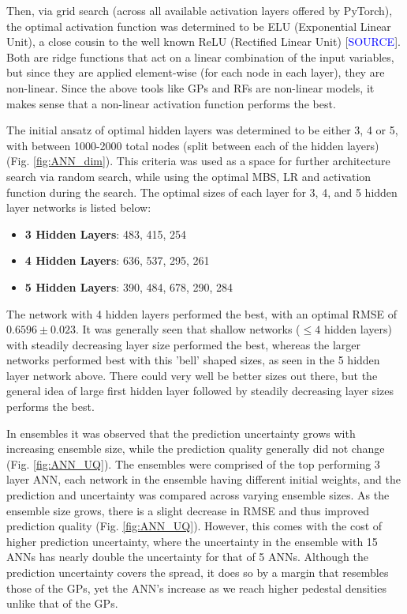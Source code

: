 \documentclass[a4paper, twoside, final, 12pt]{article}
\begin{document}
{Then, via grid search (across all available activation layers offered by PyTorch), the optimal activation function was determined to be ELU (Exponential Linear Unit), a close cousin to the well known ReLU (Rectified Linear Unit) [\textcolor{blue}{SOURCE}]. Both are ridge functions that act on a linear combination of the input variables, but since they are applied element-wise (for each node in each layer), they are non-linear. Since the above tools like GPs and RFs are non-linear models, it makes sense that a non-linear activation function performs the best. 

The initial ansatz of optimal hidden layers was determined to be either 3, 4 or 5, with between 1000-2000 total nodes (split between each of the hidden layers) (Fig. \ref{fig:ANN_dim}). This criteria was used as a space for further architecture search via random search, while using the optimal MBS, LR and activation function during the search. 
The optimal sizes of each layer for 3, 4, and 5 hidden layer networks is listed below: 
\begin{itemize}
	\item \textbf{3 Hidden Layers}: 483, 415, 254
	\item \textbf{4 Hidden Layers}: 636, 537, 295, 261
	\item \textbf{5 Hidden Layers}: 390, 484, 678, 290, 284
\end{itemize} 
The network with 4 hidden layers performed the best, with an optimal RMSE of $0.6596 \pm 0.023$. 
It was generally seen that shallow networks ($\leq 4$ hidden layers) with steadily decreasing layer size performed the best, whereas the larger networks performed best with this 'bell' shaped sizes, as seen in the 5 hidden layer network above. 
There could very well be better sizes out there, but the general idea of large first hidden layer followed by steadily decreasing layer sizes performs the best.

In ensembles it was observed that the prediction uncertainty grows with increasing ensemble size, while the prediction quality generally did not change (Fig. \ref{fig:ANN_UQ}). The ensembles were comprised of the top performing 3 layer ANN, each network in the ensemble having different initial weights, and the prediction and uncertainty was compared across varying ensemble sizes. As the ensemble size grows, there is a slight decrease in RMSE and thus improved prediction quality (Fig. \ref{fig:ANN_UQ}). However, this comes with the cost of higher prediction uncertainty, where the uncertainty in the ensemble with 15 ANNs has nearly double the uncertainty for that of 5 ANNs. Although the prediction uncertainty covers the spread, it does so by a margin that resembles those of the GPs, yet the ANN's increase as we reach higher pedestal densities unlike that of the GPs. 

}
\end{document}
